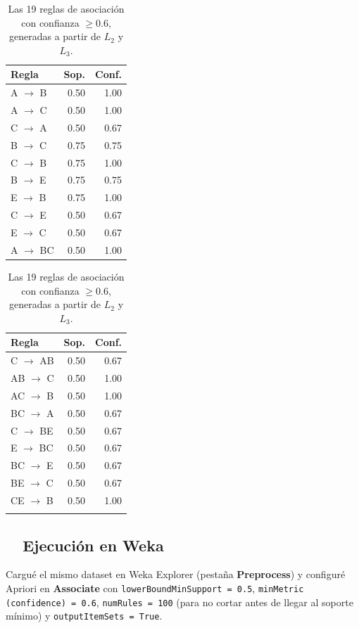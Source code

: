 \documentclass[11pt,a4paper]{article}
\begin{document}
\begin{table}[H]
\centering
\small
\begin{minipage}{0.48\linewidth}
\centering
\begin{tabular}{lrr}
\toprule
\textbf{Regla} & \textbf{Sop.} & \textbf{Conf.} \\
\midrule
A $\to$ B    & 0.50 & 1.00 \\
A $\to$ C    & 0.50 & 1.00 \\
C $\to$ A    & 0.50 & 0.67 \\
B $\to$ C    & 0.75 & 0.75 \\
C $\to$ B    & 0.75 & 1.00 \\
B $\to$ E    & 0.75 & 0.75 \\
E $\to$ B    & 0.75 & 1.00 \\
C $\to$ E    & 0.50 & 0.67 \\
E $\to$ C    & 0.50 & 0.67 \\
A $\to$ BC   & 0.50 & 1.00 \\
\bottomrule
\end{tabular}
\end{minipage}%
\begin{minipage}{0.48\linewidth}
\centering
\begin{tabular}{lrr}
\toprule
\textbf{Regla} & \textbf{Sop.} & \textbf{Conf.} \\
\midrule
C $\to$ AB   & 0.50 & 0.67 \\
AB $\to$ C   & 0.50 & 1.00 \\
AC $\to$ B   & 0.50 & 1.00 \\
BC $\to$ A   & 0.50 & 0.67 \\
C $\to$ BE   & 0.50 & 0.67 \\
E $\to$ BC   & 0.50 & 0.67 \\
BC $\to$ E   & 0.50 & 0.67 \\
BE $\to$ C   & 0.50 & 0.67 \\
CE $\to$ B   & 0.50 & 1.00 \\
 & & \\
\bottomrule
\end{tabular}
\end{minipage}
\caption{Las 19 reglas de asociación con confianza $\geq 0.6$, generadas a partir de $L_2$ y $L_3$.}
\end{table}

\subsection{\faDesktop\ \ Ejecución en Weka}
Cargué el mismo dataset en Weka Explorer (pestaña \textbf{Preprocess}) y configuré Apriori en \textbf{Associate} con \texttt{lowerBoundMinSupport = 0.5}, \texttt{minMetric (confidence) = 0.6}, \texttt{numRules = 100} (para no cortar antes de llegar al soporte mínimo) y \texttt{outputItemSets = True}.
\end{document}

